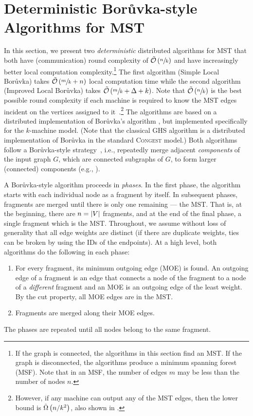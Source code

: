 \section{Deterministic Bor\r{u}vka-style Algorithms for MST}\label{sec:boruvka}
In this section, we present two \emph{deterministic} distributed algorithms for MST that both have (communication) round complexity of \(\tilde{\mathcal{O}}\left(\sfrac{n}{k}\right)\) and have increasingly better local computation complexity.\footnote{If the graph is connected, the algorithms in this section find an MST. If the graph is disconnected, the algorithms produce a minimum spanning forest (MSF). Note that in an MSF, the number of edges $m$ may be less than the number of nodes $n$.} The  first algorithm (Simple Local Bor\r{u}vka) takes \(\tilde{\mathcal{O}}\left(\sfrac{m}{k} +  n\right)\) local computation time while the second algorithm (Improved Local Bor\r{u}vka) takes \(\tilde{\mathcal{O}}\left(\sfrac{m}{k} + \Delta + k\right)\). 
Note that $\tilde{\mathcal{O}}\left(\sfrac{n}{k}\right)$
is the best possible round complexity if each machine is required to know the MST edges incident on
the vertices assigned to it~\cite{KlauckNPR15}.\footnote{However, if any machine can output any of the MST edges, then the lower bound is $\tilde{\Omega}\left(n/k^2\right)$, also shown in \cite{KlauckNPR15}.}
The algorithms are based on a distributed implementation of Bor\r{u}vka's algorithm \cite{Boruvka26,dnabook},  but implemented specifically for the \(k\)-machine model. (Note
that the classical GHS algorithm \cite{GallagerHS83} is a distributed implementation of Bor\r{u}vka in the standard \textsc{Congest} model.) Both algorithms follow a Bor\r{u}vka-style strategy~\cite{Boruvka26}, i.e., repeatedly merge adjacent \emph{components} of the input graph \(G\), which are connected subgraphs of \(G\), to form larger (connected) components (e.g., \cite{dnabook}).

A Bor\r{u}vka-style algorithm proceeds in \emph{phases}. In the first phase, the  algorithm starts with each individual node as a fragment by itself. In subsequent phases, fragments are merged until there is only one remaining --- the MST. That is, at the beginning, there are \(n=\left\lvert V\right\rvert\) fragments, and at the end of the final phase, a single fragment which is the MST. Throughout, we assume without loss of generality that all edge weights are distinct (if there are duplicate weights, ties can be broken by using the IDs of the endpoints).
At a high level, both algorithms do the following  in each phase:
\begin{enumerate}
    \item For every fragment, its minimum outgoing edge (MOE) is found. An outgoing edge of a fragment is an edge that connects a node of the fragment to a node of a \emph{different} fragment
          and an MOE is an outgoing edge of the least weight. By the cut property, all MOE edges are in the MST. %
    \item Fragments are merged along their MOE edges.
\end{enumerate}
The phases are repeated until all nodes belong to the same fragment.

